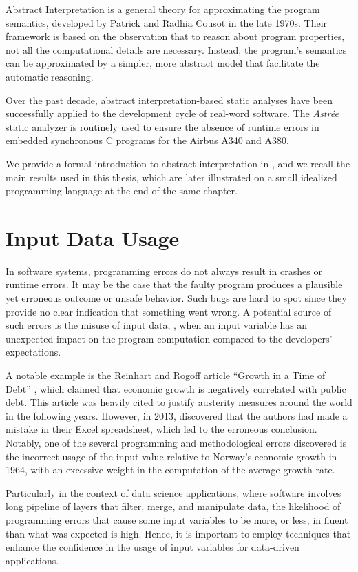 Abstract Interpretation  is a general theory for approximating the program semantics, developed by Patrick and Radhia Cousot in the late 1970s.
Their framework is based on the observation that to reason about program properties, not all the computational details are necessary.
Instead, the program's semantics can be approximated by a simpler, more abstract model that facilitate the automatic reasoning.

Over the past decade, abstract interpretation-based static analyses have been successfully applied to the development cycle of real-word software.
The \emph{Astrée} static analyzer  is routinely used to ensure the absence of runtime errors in embedded synchronous C programs for the Airbus A340 and A380.

We provide a formal introduction to abstract interpretation in ,
and we recall the main results used in this thesis, which are later illustrated
on a small idealized programming language at the end of the same chapter.


\section{Input Data Usage}

In software systems, programming errors do not always result in crashes or runtime errors.
It may be the case that the faulty program produces a plausible yet erroneous outcome or unsafe behavior.
Such bugs are hard to spot since they provide no clear indication that something went wrong.
A potential source of such errors is the misuse of input data, \ie, when an input variable has an unexpected impact on the program computation compared to the developers' expectations.

A notable example is the Reinhart and Rogoff article ``Growth in a Time of Debt'' , which claimed that economic growth is negatively correlated with public debt.
This article was heavily cited to justify austerity measures around the world in the following years.
However, in 2013,  discovered that the authors had made a mistake in their Excel spreadsheet, which led to the erroneous conclusion.
Notably, one of the several programming and methodological errors discovered is the incorrect usage of the input value relative to Norway's economic growth in 1964, with an excessive weight in the computation of the average growth rate.

Particularly in the context of data science applications, where software involves long pipeline of layers that filter, merge, and manipulate data, the likelihood of programming errors that cause some input variables to be more, or less, in fluent than what was expected is high.
Hence, it is important to employ techniques that enhance the confidence in the usage of input variables for data-driven applications.

